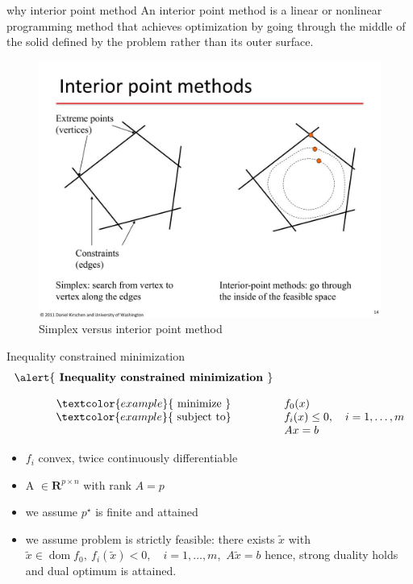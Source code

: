 \documentclass{beamer}
\begin{document}
\begin{frame}{why interior point method}
An \alert {interior point method } is a linear or nonlinear programming method that achieves optimization by going through the \alert{middle} of the solid defined by the problem rather than its outer surface.
		\begin{figure}
		\centering
		\includegraphics[width=0.6\linewidth]{Images/interior-point-methods-l}
		\caption{Simplex versus interior point method}
	\end{figure}
	
\end{frame}


\begin{frame}[noframenumbering]{Inequality constrained minimization}
	\begin{equation*}
	\begin{array}{cl}\alert{\textbf{ Inequality constrained minimization }} \\[0.4cm] \textcolor{example}{\text { minimize }} & {f_{0}(x)} \\ \textcolor{example}{\text { subject to}} & {f_{i}(x) \leq 0, \quad i=1, \ldots, m} \\ & {A x=b}\end{array}
	\end{equation*}
	\begin{itemize}
		\item $f_i$ convex, twice continuously differentiable \\
		 \item A $ \in \mathbf{R}^{p \times n} $ with rank $ A = p$ \\
		 \item we assume  $ p^{\star} $  is finite and attained \\
		 \item  we assume problem is strictly feasible: there exists $ \tilde{x}$ with $ \tilde{x} \in \operatorname{dom} f_{0},\ f_{i}  (\tilde{x})<0, \quad i=1, \ldots, m$,\ $A\tilde{x}=b$
		  hence, strong duality holds and dual optimum is attained.
	\end{itemize}
\end{frame}
\end{document}

